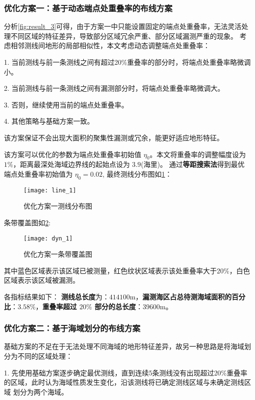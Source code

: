 \documentclass[withoutpreface,bwprint]{cumcmthesis} %
\begin{document}
        \subsubsection{优化方案一：基于动态端点处重叠率的布线方案}
        分析\cref{fig:result_3}可得，由于方案一中只能设置固定的端点处重叠率，无法灵活处理不同区域的特征差异，导致部分区域冗余严重、部分区域漏测严重的现象。
        考虑相邻测线间地形的局部相似性，本文考虑动态调整端点处重叠率：

        1. 当前测线与前一条测线之间有超过20\%重叠率的部分时，将端点处重叠率略微调小。

        2. 当前测线与前一条测线之间有漏测部分时，将端点处重叠率略微调大。

        3. 否则，继续使用当前的端点处重叠率。

        4. 其他策略与基础方案一致。
        
        该方案保证不会出现大面积的聚集性漏测或冗余，能更好适应地形特征。

        该方案可以优化的参数为端点处重叠率初始值 $\eta_0 $。本文将重叠率的调整幅度设为$1\%$，距离最深处海域边界线的起始点设为 $3.9$(海里)。
        通过\textbf{等距搜索法}得到最优端点处重叠率初始值为 $\eta_0 = 0.02$,
        最终测线分布图如\cref{fig:line_1}：
        \begin{figure}[H]
            \centering
            \texttt{[image: line\_1]}
            \caption{优化方案一测线分布图}
            \label{fig:line_1}
        \end{figure}
        条带覆盖图如\cref{fig:dyn_1}:
        \begin{figure}[H]
            \centering
            \texttt{[image: dyn\_1]}
            \caption{优化方案一条带覆盖图}
            \label{fig:dyn_1}
        \end{figure}
        其中蓝色区域表示该区域已被测量，红色纹状区域表示该处重叠率大于20\%，白色区域表示该区域被漏测。
       
        各指标结果如下：
        \textbf{测线总长度}为：$414100$m，\textbf{漏测海区占总待测海域面积的百分比}：$3.58\%$，\textbf{重叠率超过 $20\%$ 部分的总长度}：$39600$m。
        \subsubsection{优化方案二：基于海域划分的布线方案}
        基础方案的不足在于无法处理不同海域的地形特征差异，故另一种思路是将海域划分为不同的区域处理：

        1. 先使用基础方案逐步确定最优测线，直到连续5条测线没有出现超过20\%重叠率的区域，此时认为海域性质发生变化，沿该测线将已确定测线区域与未确定测线区域
        划分为两个海域。
\end{document}
